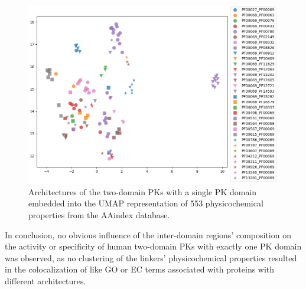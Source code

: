 	\begin{figure}
		\centering
		\includegraphics[width=\linewidth]{img/aa_umap_arch.png}
		\caption{Architectures of the two-domain PKs with a single PK domain embedded into the
		UMAP representation of 553 physicochemical properties from the AAindex database.}
		\label{fig:aa_umap}
	\end{figure}

	In conclusion, no obvious influence of the inter-domain regions' composition on the
	activity or specificity of human two-domain PKs with exactly one PK domain was observed,
	as no clustering of the linkers' physicochemical properties resulted in the
	colocalization of like GO or EC terms associated with proteins with different
	architectures.
